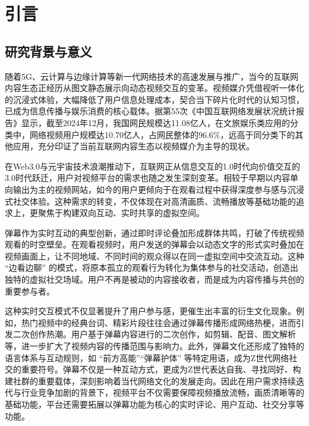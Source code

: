 \section{引言}

\subsection{研究背景与意义}

随着5G、云计算与边缘计算等新一代网络技术的高速发展与推广，当今的互联网内容生态正经历从图文静态展示向动态视频交互的变革。视频媒介凭借视听一体化的沉浸式体验，大幅降低了用户信息处理成本，契合当下碎片化时代的认知习惯，已成为信息传播与娱乐消费的核心载体。据第55次《中国互联网络发展状况统计报告》\cite{RN01}显示，截至2024年12月，我国网民规模达11.08亿人，在文旅娱乐类应用的分类中，网络视频用户规模达10.70亿人，占网民整体的96.6\%，远高于同分类下的其他应用，充分印证了当前互联网内容生态以视频媒介为主导的现状。

在Web3.0与元宇宙技术浪潮推动下，互联网正从信息交互的1.0时代向价值交互的3.0时代跃迁，用户对视频平台的需求也随之发生深刻变革。相较于早期以内容单向输出为主的视频网站，如今的用户更倾向于在观看过程中获得深度参与感与沉浸式社交体验\label{用户交流}。这种需求的转变，不仅体现在对高清画质、流畅播放等基础功能的追求上，更聚焦于构建双向互动、实时共享的虚拟空间。

弹幕作为实时互动的典型创新，通过即时评论叠加形成群体共鸣，打破了传统视频观看的时空壁垒。在观看视频时，用户发送的弹幕会以动态文字的形式实时叠加在视频画面上，让不同地域、不同时间的观众得以在同一虚拟空间中交流互动。这种 “边看边聊” 的模式，将原本孤立的观看行为转化为集体参与的社交活动，创造出独特的虚拟社交场域。用户不再是被动的内容接收者，而是成为内容传播与共创的重要参与者。

这种实时交互模式不仅显著提升了用户参与感，更催生出丰富的衍生文化现象。例如，热门视频中的经典台词、精彩片段往往会通过弹幕传播形成网络热梗，进而引发二次创作热潮。用户基于弹幕内容进行的二次创作，如剪辑、配音、图文解析等，进一步扩大了视频内容的传播范围与影响力。此外，弹幕文化还形成了独特的语言体系与互动规则，如 “前方高能”“弹幕护体” 等特定用语，成为Z世代网络社交的重要符号。弹幕不仅是一种互动方式，更成为Z世代表达自我、寻找同好、构建社群的重要载体，深刻影响着当代网络文化的发展走向。因此在用户需求持续迭代与行业竞争加剧的背景下，视频平台不仅需要保障视频播放流畅，画质清晰等的基础功能，平台还需要拓展以弹幕功能为核心的实时评论、用户互动、社交分享等功能。

